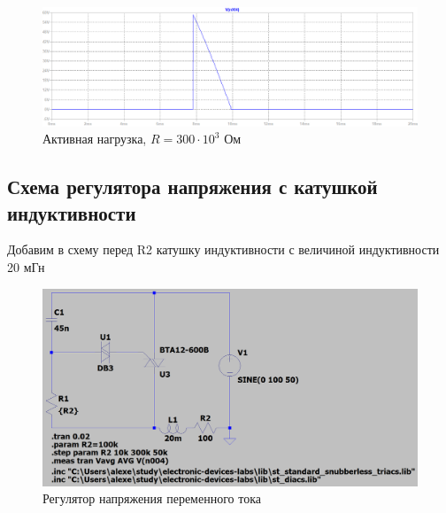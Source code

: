 \documentclass[a4paper, 12pt]{article}
\begin{document}
    \begin{figure}[H]
        \centering
        \includegraphics[scale=0.45]{R2-300k.png}
        \captionsetup{skip=0pt}
        \caption{Активная нагрузка, $R=300\cdot10^3$ Ом}
        \label{fig:R2-300k}
    \end{figure}
    \vfill


    \subsection{Схема регулятора напряжения с катушкой индуктивности}
    Добавим в схему перед R2 катушку индуктивности с величиной индуктивности 20 мГн
    \begin{figure}[H]
        \centering
        \includegraphics[scale=0.3]{scheme5.png}
        \captionsetup{skip=0pt}
        \caption{Регулятор напряжения переменного тока}
        \label{fig:scheme5}
    \end{figure}
\end{document}
